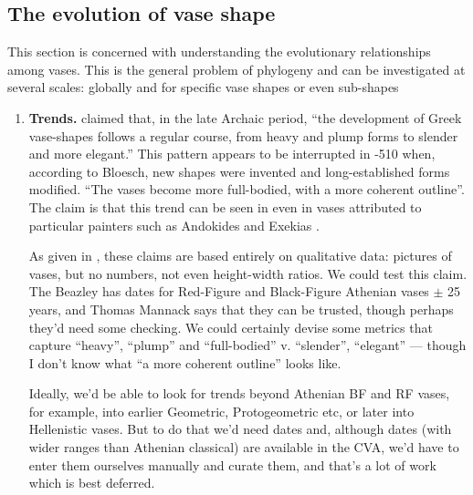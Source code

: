 \documentclass[onecolumn,10pt]{article}
\begin{document}
\subsection*{The evolution of vase shape}
This section is concerned with understanding the evolutionary relationships among vases.  This is the general problem of phylogeny and can be investigated at several scales:  globally and for specific vase shapes or even sub-shapes
\begin{enumerate}

\item \textbf{Trends.}  \textcite{Bloesch1940, Bloesch1951}  claimed that, in the late Archaic period, ``the development of Greek vase-shapes follows a regular course, from heavy and plump forms to slender and more elegant.'' This pattern appears to be interrupted in -510 when, according to Bloesch, new shapes were invented and long-established forms modified. ``The vases become more full-bodied, with a more coherent outline''.  The claim is that this  trend can be seen in even in vases attributed to particular painters such as  Andokides and  Exekias \parencite{Mackay2010}.

As given in \textcite{Bloesch1951}, these claims are based entirely on qualitative data:  pictures of vases, but no numbers, not even height-width ratios.  We could test this claim.  The Beazley has dates for Red-Figure and Black-Figure Athenian vases $\pm$ 25 years, and Thomas Mannack says that they can be trusted, though perhaps they'd need some checking. We could certainly devise some metrics that capture ``heavy'', ``plump'' and  ``full-bodied'' v. ``slender'', ``elegant'' --- though I don't know what ``a more coherent outline'' looks like. 

Ideally, we'd be able to look for trends beyond Athenian BF and RF vases, for example, into earlier Geometric, Protogeometric etc, or later into Hellenistic vases. But to do that we'd need dates and, although dates (with wider ranges than Athenian classical) are available in the CVA, we'd have to enter them ourselves manually and curate them, and that's a lot of work which is best deferred. 


\end{enumerate}
\end{document}
